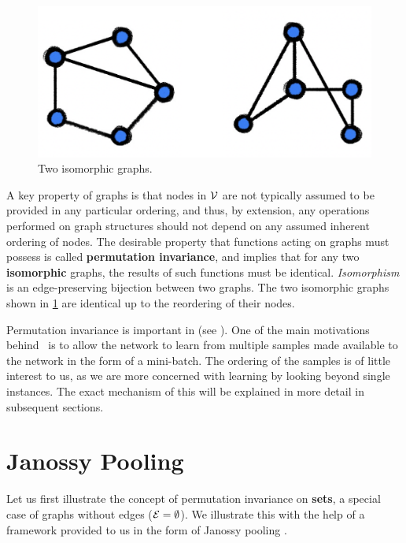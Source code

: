 \begin{figure}
    \centering
    \includegraphics[scale=0.15]{chapters/assets/graph-figs/mn_isomorphic.png}
    \caption{Two isomorphic graphs.}
    \label{fig:graph-isomorphism}
\end{figure}
A key property of graphs is that nodes in $\mathcal{V}$ are not typically assumed to be provided in any particular ordering, and thus, by extension, any operations performed on graph structures should not depend on any assumed inherent ordering of nodes. The desirable property that functions acting on graphs must possess is called \textbf{permutation invariance}, and implies that for any two \textbf{isomorphic} graphs, the results of such functions must be identical. {\em Isomorphism} is an edge-preserving bijection between two graphs. The two isomorphic graphs shown in \cref{fig:graph-isomorphism} are identical up to the reordering of their nodes.

Permutation invariance is important in \samptr{}(see ). One of the main motivations behind \samptr\ is to allow the network to learn from multiple samples made available to the network in the form of a mini-batch. The ordering of the samples is of little interest to us, as we are more concerned with learning by looking beyond single instances. The exact mechanism of this will be explained in more detail in subsequent sections.


\section{Janossy Pooling}\label{sec:janossy-pooling}
Let us first illustrate the concept of permutation invariance on \textbf{sets}, a special case of graphs without edges ($\mathcal{E}=\emptyset$). We illustrate this with the help of a framework provided to us in the form of Janossy pooling \parencite{Murphy2018}.

